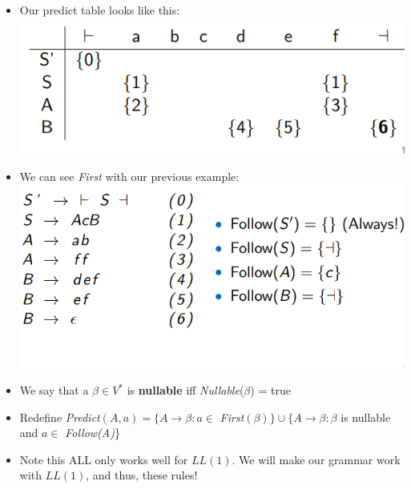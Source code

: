 \documentclass[12pt]{article}
\begin{document}
\begin{itemize}
    \item Our predict table looks like this: \\
        \includegraphics[scale=0.5]{aug_predict.png}
    \item We can see \emph{First} with our previous example:\\
        \includegraphics[scale=0.5]{first_example.png}
    \item We say that a $\beta \in V^*$ is \textbf{nullable} iff \emph{Nullable}($\beta$) = true
    \item Redefine \emph{Predict}$(A, a) =  \{A \rightarrow \beta : a \in$ \emph{First}$(\beta)\} \cup \{A \rightarrow \beta : \beta$ is nullable and $a \in$ \emph{Follow(A)}\}
    \item Note this ALL only works well for $LL(1)$. We will make our grammar work with $LL(1)$, and thus, these rules!
\end{itemize}
\end{document}
